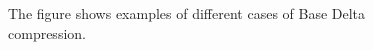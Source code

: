 \begin{figure}
    \caption[Base Delta Compression Examples]{The figure shows examples of different cases of Base Delta compression.}
    \label{fig:BaseDeltaCompression}
\end{figure}
